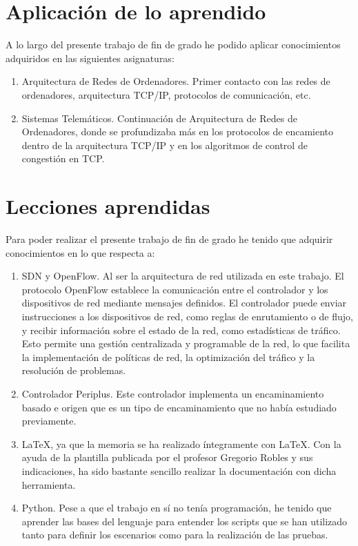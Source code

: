 \documentclass[a4paper, 12pt]{book}
\begin{document}
	\section{Aplicación de lo aprendido}
	\label{sec:aplicacion}
	A lo largo del presente trabajo de fin de grado he podido aplicar conocimientos adquiridos en las siguientes asignaturas: 
	\begin{enumerate}
		\item Arquitectura de Redes de Ordenadores. Primer contacto con las redes de ordenadores, arquitectura TCP/IP, protocolos de comunicación, etc.
		\item Sistemas Telemáticos. Continuación de Arquitectura de Redes de Ordenadores, donde se profundizaba más en los protocolos de encamiento dentro de la arquitectura TCP/IP y en los algoritmos de control de congestión en TCP.
	\end{enumerate}
	
	
	\section{Lecciones aprendidas}
	\label{sec:lecciones_aprendidas}
	
	Para poder realizar el presente trabajo de fin de grado he tenido que adquirir conocimientos en lo que respecta a:
	
	\begin{enumerate}
		\item SDN y OpenFlow. Al ser la arquitectura de red utilizada en este trabajo. El protocolo OpenFlow establece la comunicación entre el controlador y los dispositivos de red mediante mensajes definidos. El controlador puede enviar instrucciones a los dispositivos de red, como reglas de enrutamiento o de flujo, y recibir información sobre el estado de la red, como estadísticas de tráfico. Esto permite una gestión centralizada y programable de la red, lo que facilita la implementación de políticas de red, la optimización del tráfico y la resolución de problemas.
		\item Controlador Periplus. Este controlador implementa un encaminamiento basado e origen que es un tipo de encaminamiento que no había estudiado previamente.
		\item LaTeX, ya que la memoria se ha realizado íntegramente con LaTeX. Con la ayuda de la plantilla publicada por el profesor Gregorio Robles y sus indicaciones, ha sido bastante sencillo realizar la documentación con dicha herramienta.
		\item Python. Pese a que el trabajo en sí no tenía programación, he tenido que aprender las bases del lenguaje para entender los scripts que se han utilizado tanto para definir los escenarios como para la realización de las pruebas.
		
	\end{enumerate}
	
\end{document}
